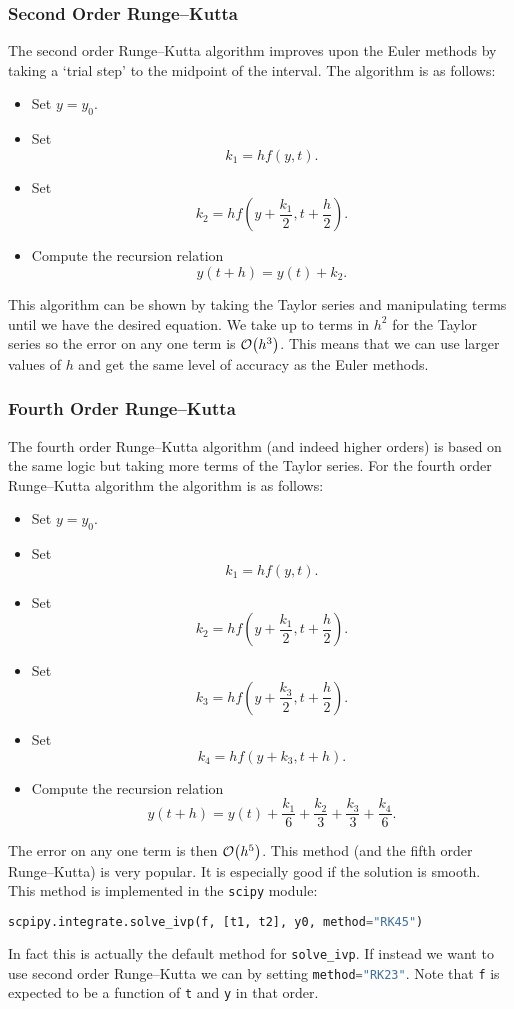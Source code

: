 \documentclass[a4paper]{article}
\begin{document}
    \subsubsection{Second Order Runge--Kutta}
    The second order Runge--Kutta algorithm improves upon the Euler methods by taking a `trial step' to the midpoint of the interval.
    The algorithm is as follows:
    \begin{itemize}
        \item Set \(y = y_0\).
        \item Set
        \[k_1 = hf(y, t).\]
        \item Set
        \[k_2 = hf\left(y + \frac{k_1}{2}, t + \frac{h}{2}\right).\]
        \item Compute the recursion relation
        \[y(t + h) = y(t) + k_2.\]
    \end{itemize}
    This algorithm can be shown by taking the Taylor series and manipulating terms until we have the desired equation.
    We take up to terms in \(h^2\) for the Taylor series so the error on any one term is \(\order{h^3}\).
    This means that we can use larger values of \(h\) and get the same level of accuracy as the Euler methods.
    
    \subsubsection{Fourth Order Runge--Kutta}
    The fourth order Runge--Kutta algorithm (and indeed higher orders) is based on the same logic but taking more terms of the Taylor series.
    For the fourth order Runge--Kutta algorithm the algorithm is as follows:
    \begin{itemize}
        \item Set \(y = y_0\).
        \item Set
        \[k_1 = hf(y, t).\]
        \item Set
        \[k_2 = hf\left(y + \frac{k_1}{2}, t + \frac{h}{2}\right).\]
        \item Set
        \[k_3 = hf\left(y + \frac{k_3}{2}, t + \frac{h}{2}\right).\]
        \item Set
        \[k_4 = hf(y + k_3, t + h).\]
        \item Compute the recursion relation
        \[y(t + h) = y(t) + \frac{k_1}{6} + \frac{k_2}{3} + \frac{k_3}{3} + \frac{k_4}{6}.\]
    \end{itemize}
    The error on any one term is then \(\order{h^5}\).
    This method (and the fifth order Runge--Kutta) is very popular.
    It is especially good if the solution is smooth.
    This method is implemented in the \lstinline|scipy| module:
    \begin{lstlisting}[language=python]
    scpipy.integrate.solve_ivp(f, [t1, t2], y0, method="RK45")
    \end{lstlisting}
    In fact this is actually the default method for \lstinline[language=python]|solve_ivp|.
    If instead we want to use second order Runge--Kutta we can by setting \lstinline[language=python]|method="RK23"|.
    Note that \lstinline[language=python]|f| is expected to be a function of \lstinline[language=python]|t| and \lstinline[language=python]|y| in that order.
    
\end{document}

